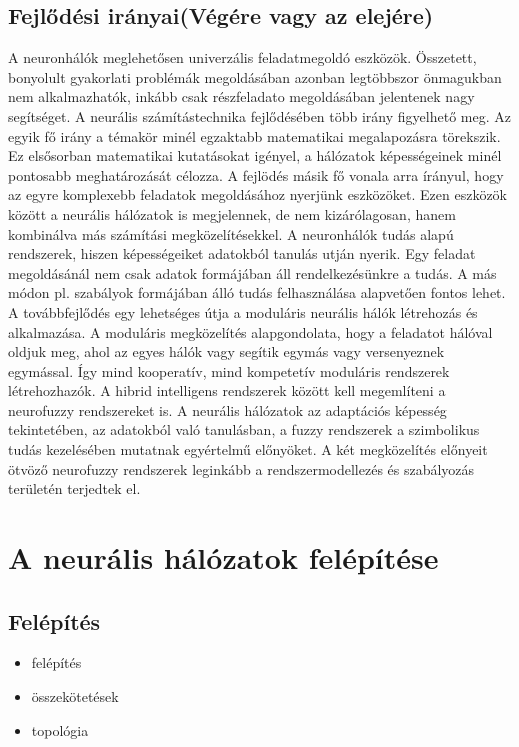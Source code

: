 \documentclass[letterpaper,10pt,magyar]{sphinxmanual}
\begin{document}
\section{Fejlődési irányai(Végére vagy az elejére)}
\label{\detokenize{pages/overview:fejlodesi-iranyai-vegere-vagy-az-elejere}}
A neuronhálók meglehetősen univerzális feladatmegoldó eszközök. Összetett, bonyolult gyakorlati problémák megoldásában azonban legtöbbszor önmagukban nem alkalmazhatók, inkább csak részfeladato megoldásában jelentenek nagy segítséget. A neurális számítástechnika fejlődésében több irány figyelhető meg. Az egyik fő irány a témakör minél egzaktabb matematikai megalapozásra törekszik. Ez elsősorban matematikai kutatásokat igényel, a hálózatok képességeinek minél pontosabb meghatározását célozza.
A fejlödés másik fő vonala arra írányul, hogy az egyre komplexebb feladatok megoldásához nyerjünk eszközöket. Ezen eszközök között a neurális hálózatok is megjelennek, de nem kizárólagosan, hanem kombinálva más számítási megközelítésekkel. A neuronhálók tudás alapú rendszerek, hiszen képességeiket adatokból tanulás utján nyerik. Egy feladat megoldásánál nem csak adatok formájában áll rendelkezésünkre a tudás. A más módon pl. szabályok formájában álló tudás felhasználása alapvetően fontos lehet.
A továbbfejlődés egy lehetséges útja a moduláris neurális hálók létrehozás és alkalmazása. A moduláris megközelítés alapgondolata, hogy a feladatot hálóval oldjuk meg, ahol az egyes hálók vagy segítik egymás vagy versenyeznek egymással. Így mind kooperatív, mind kompetetív moduláris rendszerek létrehozhazók.
A hibrid intelligens rendszerek között kell megemlíteni a neurofuzzy rendszereket is. A neurális hálózatok az adaptációs képesség tekintetében, az adatokból való tanulásban, a fuzzy rendszerek a szimbolikus tudás kezelésében mutatnak egyértelmű előnyöket. A két megközelítés előnyeit ötvöző neurofuzzy rendszerek leginkább a rendszermodellezés és szabályozás területén terjedtek el.


\chapter{A neurális hálózatok felépítése}
\label{\detokenize{pages/neural_network::doc}}\label{\detokenize{pages/neural_network:a-neuralis-halozatok-felepitese}}

\section{Felépítés}
\label{\detokenize{pages/neural_network:felepites}}\begin{itemize}
\item {} 
felépítés

\item {} 
összekötetések

\item {} 
topológia

\end{itemize}
\end{document}
